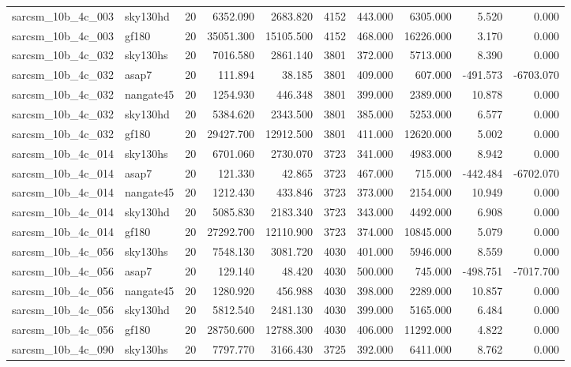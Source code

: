 \documentclass{article}
\begin{document}
\begin{longtable}{llrrrrrrrr}
sarcsm\_10b\_4c\_003 & sky130hd & 20 & 6352.090 & 2683.820 & 4152 & 443.000 & 6305.000 & 5.520 & 0.000 \\
sarcsm\_10b\_4c\_003 & gf180 & 20 & 35051.300 & 15105.500 & 4152 & 468.000 & 16226.000 & 3.170 & 0.000 \\
sarcsm\_10b\_4c\_032 & sky130hs & 20 & 7016.580 & 2861.140 & 3801 & 372.000 & 5713.000 & 8.390 & 0.000 \\
sarcsm\_10b\_4c\_032 & asap7 & 20 & 111.894 & 38.185 & 3801 & 409.000 & 607.000 & -491.573 & -6703.070 \\
sarcsm\_10b\_4c\_032 & nangate45 & 20 & 1254.930 & 446.348 & 3801 & 399.000 & 2389.000 & 10.878 & 0.000 \\
sarcsm\_10b\_4c\_032 & sky130hd & 20 & 5384.620 & 2343.500 & 3801 & 385.000 & 5253.000 & 6.577 & 0.000 \\
sarcsm\_10b\_4c\_032 & gf180 & 20 & 29427.700 & 12912.500 & 3801 & 411.000 & 12620.000 & 5.002 & 0.000 \\
sarcsm\_10b\_4c\_014 & sky130hs & 20 & 6701.060 & 2730.070 & 3723 & 341.000 & 4983.000 & 8.942 & 0.000 \\
sarcsm\_10b\_4c\_014 & asap7 & 20 & 121.330 & 42.865 & 3723 & 467.000 & 715.000 & -442.484 & -6702.070 \\
sarcsm\_10b\_4c\_014 & nangate45 & 20 & 1212.430 & 433.846 & 3723 & 373.000 & 2154.000 & 10.949 & 0.000 \\
sarcsm\_10b\_4c\_014 & sky130hd & 20 & 5085.830 & 2183.340 & 3723 & 343.000 & 4492.000 & 6.908 & 0.000 \\
sarcsm\_10b\_4c\_014 & gf180 & 20 & 27292.700 & 12110.900 & 3723 & 374.000 & 10845.000 & 5.079 & 0.000 \\
sarcsm\_10b\_4c\_056 & sky130hs & 20 & 7548.130 & 3081.720 & 4030 & 401.000 & 5946.000 & 8.559 & 0.000 \\
sarcsm\_10b\_4c\_056 & asap7 & 20 & 129.140 & 48.420 & 4030 & 500.000 & 745.000 & -498.751 & -7017.700 \\
sarcsm\_10b\_4c\_056 & nangate45 & 20 & 1280.920 & 456.988 & 4030 & 398.000 & 2289.000 & 10.857 & 0.000 \\
sarcsm\_10b\_4c\_056 & sky130hd & 20 & 5812.540 & 2481.130 & 4030 & 399.000 & 5165.000 & 6.484 & 0.000 \\
sarcsm\_10b\_4c\_056 & gf180 & 20 & 28750.600 & 12788.300 & 4030 & 406.000 & 11292.000 & 4.822 & 0.000 \\
sarcsm\_10b\_4c\_090 & sky130hs & 20 & 7797.770 & 3166.430 & 3725 & 392.000 & 6411.000 & 8.762 & 0.000 \\

\end{longtable}
\end{document}
